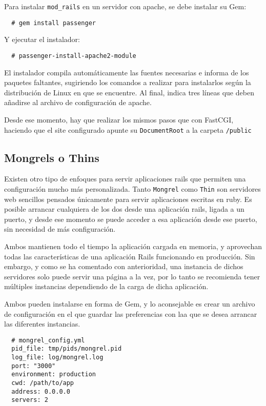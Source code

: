 Para instalar \texttt{mod\_rails} en un servidor con apache, se debe instalar su Gem:

\begin{verbatim}
  # gem install passenger
\end{verbatim}

Y ejecutar el instalador:

\begin{verbatim}
  # passenger-install-apache2-module
\end{verbatim}

El instalador compila automáticamente las fuentes necesarias e informa de los paquetes faltantes, sugiriendo los comandos a realizar para instalarlos según la distribución de Linux en que se encuentre. Al final, indica tres líneas que deben añadirse al archivo de configuración de apache.

Desde ese momento, hay que realizar los mismos pasos que con FastCGI, haciendo que el site configurado apunte su \texttt{DocumentRoot} a la carpeta \texttt{/public}


\subsection{Mongrels o Thins} %
\label{sub:mongrels_thins}

Existen otro tipo de enfoques para servir aplicaciones rails que permiten una configuración mucho más personalizada. Tanto \texttt{Mongrel} como \texttt{Thin} son servidores web sencillos pensados únicamente para servir aplicaciones escritas en ruby. Es posible arrancar cualquiera de los dos desde una aplicación rails, ligada a un puerto, y desde ese momento se puede acceder a esa aplicación desde ese puerto, sin necesidad de más configuración.

Ambos mantienen todo el tiempo la aplicación cargada en memoria, y aprovechan todas las características de una aplicación Rails funcionando en producción. Sin embargo, y como se ha comentado con anterioridad, una instancia de dichos servidores solo puede servir una página a la vez, por lo tanto se recomienda tener múltiples instancias dependiendo de la carga de dicha aplicación.

Ambos pueden instalarse en forma de Gem, y lo aconsejable es crear un archivo de configuración en el que guardar las preferencias con laa que se desea arrancar las diferentes instancias.

\begin{verbatim}
  # mongrel_config.yml
  pid_file: tmp/pids/mongrel.pid
  log_file: log/mongrel.log
  port: "3000"
  environment: production
  cwd: /path/to/app
  address: 0.0.0.0
  servers: 2
\end{verbatim}

